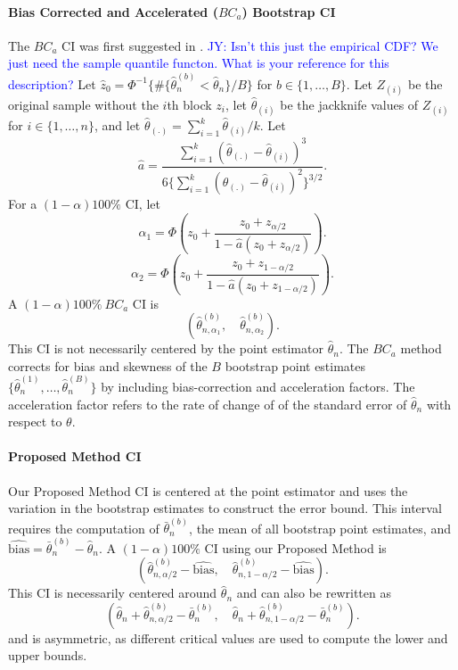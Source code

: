 \documentclass[12pt, letterpaper, titlepage]{article}
\newcommand{\jy}[1]{\textcolor{blue}{JY: #1}}
\begin{document}
\paragraph{Bias Corrected and Accelerated ($BC_a$) Bootstrap CI}
The $BC_a$ CI was first suggested in \citet{efron1987better}.
\jy{Isn't this just the empirical CDF? We just need the sample quantile functon.
  What is your reference for this description?}
Let $\hat{z}_0 = \Phi^{-1}\{\#\{\hat\theta_n^{(b)} < \hat{\theta}_n\} / B\}$
for $b \in \{1, \ldots, B\}$. 
Let $Z_{(i)}$ be the original sample without the $i$th block $z_i$, let
$\hat{\theta}_{(i)}$ be the jackknife values of $Z_{(i)}$
for $i \in \{1, \ldots, n\}$, 
and let $\hat{\theta}_{(.)} = \sum_{i=1}^{k} \hat{\theta}_{(i)} / k$. 
Let 
\[
\hat{a} = \frac{\sum_{i=1}^{k} (\hat{\theta}_{(.)} -
  \hat{\theta}_{(i)})^3}{6\{\sum_{i=1}^{k} (\hat{\theta}_{(.)} -
  \hat{\theta}_{(i)})^2\}^{3/2}}
.\] For a $(1 - \alpha)100\%$ CI, let
\[
\alpha_1 = \Phi\left(z_0 + \frac{z_{0} +
  z_{\alpha/2}}{1 - \hat{a}(z_{0} + z_{\alpha/2})}\right).
\]
\[
\alpha_2 = \Phi\left(z_0 + \frac{z_{0} +
  z_{1 - \alpha/2}}{1 - \hat{a}(z_{0} + z_{1 - \alpha/2})}\right).
\]
A $(1 - \alpha)100\%~BC_a$ CI is
\[
(\hat\theta_{n, \alpha_1}^{(b)}, \quad \hat\theta_{n, \alpha_2}^{(b)}).
\]
This CI is not necessarily centered by the point estimator $\hat\theta_n$. The
$BC_a$ method corrects for bias and skewness of the $B$ bootstrap point
estimates $\{\hat\theta_n^{(1)}, \ldots, \hat\theta_n^{(B)}\}$ by including
bias-correction and acceleration factors. The acceleration factor refers to
the 
rate of change of of the standard error of $\hat\theta_n$ with respect to
$\theta$.

\paragraph{Proposed Method CI}
Our Proposed Method CI is centered at the point estimator and uses the
variation
in the bootstrap estimates to construct the error bound. This interval requires
the computation of $\bar\theta_n^{(b)}$, the mean of all bootstrap point
estimates, and $\widehat{\text{bias}} = \bar\theta_n^{(b)} - \hat\theta_n$.
A $(1 - \alpha)100\%$ CI using our Proposed Method is
\[
(\hat\theta_{n, \alpha/2}^{(b)} - \widehat{\text{bias}}, \quad
\hat\theta_{n, 1 - \alpha/2}^{(b)} - \widehat{\text{bias}}).
\]
This CI is necessarily centered around $\hat\theta_n$ and can also be rewritten
as 
\[
(\hat\theta_n + \hat\theta_{n, \alpha/2}^{(b)} - \bar\theta_n^{(b)}, \quad
\hat\theta_n + \hat\theta_{n, 1 - \alpha/2}^{(b)} - \bar\theta_n^{(b)}).
\]
and is asymmetric, as different critical values are used to compute
the lower and upper bounds.
\end{document}
